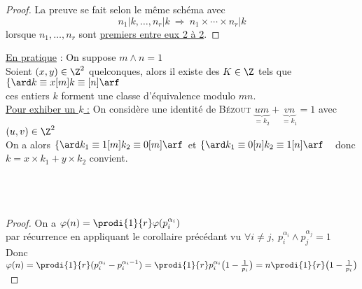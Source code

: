 		\begin{proof}
		La preuve se fait selon le même schéma avec \[ n_1|k ,\dots , n_r|k ~\Rightarrow ~n_1\times\cdots\times n_r|k \] lorsque $n_1,\dots ,n_r$ sont \uline{premiers entre eux 2 à 2}. \vspace*{0.7cm}
		\end{proof} 
		\uline{En pratique} : On suppose $m\wedge n=1$ \\
		Soient $(x,y)\in\Z^2$ quelconques, alors il existe des $K\in\Z$ tels que $\left\lbrace \ard k\equiv x [m] \\ k\equiv [n] \arf \right.$ \\
		ces entiers $k$ forment une classe d'équivalence modulo $mn$.\vspace*{0.5cm} 
		\\ \uline{Pour exhiber un $k$ :}
		On considère une identité de \textsc{Bézout} $\underbrace{um}_{=k_2} + \underbrace{vn}_{=k_1} =1$ avec $(u,v)\in \Z^2$\\ 
		On a alors $\left\lbrace \ard k_1\equiv 1[m] \\ k_2\equiv 0[m] \arf \right. $ et $\left\lbrace \ard k_1 \equiv 0 [n] \\ k_2 \equiv 1 [n] \arf \right. ~~$
		donc $k=x\times k_1 + y\times k_2$ convient. 
		\vspace*{0.5cm} \\ 
		\vspace*{0.5cm} \\ 
		\vspace*{0.5cm} \\ 
		\vspace*{0.5cm} \\ 
		\begin{proof}
		On a $\varphi(n) = \prodi{1}{r} \varphi(p_i^{\alpha_i})$ \\
		par récurrence en appliquant le corollaire précédant vu $\forall i\neq j ,~ p_i^{\alpha_i}\wedge p_j^{\alpha_j} = 1$ \\
		 Donc $\varphi(n) = \prodi{1}{r} (p_i^{\alpha_i} - p_i^{\alpha_i-1}) = \prodi{1}{r} p_i^{\alpha_i} \big(1-\frac{1}{p_i} \big) = n\prodi{1}{r} \big(1-\frac{1}{p_i} \big)$
		\end{proof}
